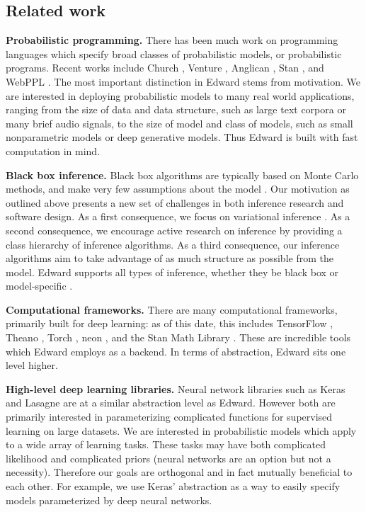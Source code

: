 \subsection*{Related work}

\textbf{Probabilistic programming.}
There has been much work on programming languages which specify
broad classes of probabilistic models, or probabilistic
programs. Recent works include
Church \citep{goodman2012church},
Venture \citep{mansinghka2014venture},
Anglican \citep{wood2015new},
Stan \citep{carpenter2016stan}, and
WebPPL \citep{goodman2014design}.
The most important distinction in Edward stems from motivation. We
are interested in deploying probabilistic models to many real
world applications, ranging from the size of data and data structure,
such as large text corpora or many brief audio signals, to the size of
model and class of models, such as small nonparametric models or deep
generative models. Thus Edward is built with fast computation in
mind.

\textbf{Black box inference.}
Black box algorithms are typically based on Monte Carlo methods, and
make very few assumptions about the
model \citep{metropolis1949monte,hastings1970monte,geman1984stochastic}.
Our motivation as outlined
above presents a new set of challenges in both inference research and
software design. As a first consequence, we focus on variational
inference \citep{hinton1993keeping,waterhouse1996bayesian,jordan1999introduction}.
As a second consequence, we encourage active research on
inference by providing a class hierarchy of inference algorithms. As a
third consequence, our inference algorithms aim to take advantage of
as much structure as possible from the model. Edward supports all
types of inference, whether they
be black box or model-specific \citep{dempster1977em,hoffman2013stochastic}.

\textbf{Computational frameworks.}
There are many computational frameworks, primarily built for deep
learning: as of this date, this includes
TensorFlow \citep{abadi2016tensorflow},
Theano \citep{alrfou2016theano},
Torch \citep{collobert2011torch7},
neon \citep{nervana2014neon}, and
the Stan Math Library \citep{carpenter2015stan}.
These are incredible tools which Edward employs as a backend. In terms
of abstraction, Edward sits one level higher.

\textbf{High-level deep learning libraries.}
Neural network libraries such as
Keras \citep{chollet2015keras} and
Lasagne \citep{lasagne}
are at a similar abstraction level as Edward. However both are primarily
interested in parameterizing complicated functions for supervised
learning on large datasets. We are interested in probabilistic models
which apply to a wide array of learning tasks. These tasks may have both
complicated likelihood and complicated priors (neural networks are an
option but not a necessity). Therefore our goals are orthogonal and in
fact mutually beneficial to each other. For example, we use Keras'
abstraction as a way to easily specify models parameterized by deep
neural networks.
